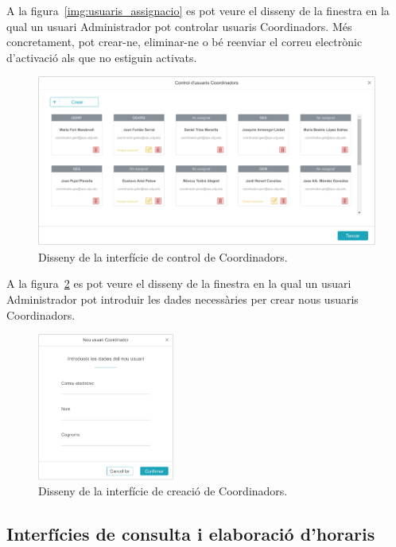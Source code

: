 \documentclass[a4paper,12pt]{ThesisStyle}
\begin{document}
A la figura~\ref{img:usuaris_assignacio} es pot veure el disseny de la finestra en la qual un usuari Administrador pot controlar usuaris Coordinadors. Més concretament, pot crear-ne, eliminar-ne o bé reenviar el correu electrònic d'activació als que no estiguin activats.
\begin{figure}[H]
	\centering
	\includegraphics[width=\textwidth]{assets/interfaces/usuaris/control.pdf}
	\caption{\label{img:usuaris_control}Disseny de la interfície de control de Coordinadors.}
\end{figure}

A la figura~\ref{img:usuaris_crear} es pot veure el disseny de la finestra en la qual un usuari Administrador pot introduir les dades necessàries per crear nous usuaris Coordinadors.
\begin{figure}[H]
	\centering
	\includegraphics[width=0.4\textwidth]{assets/interfaces/usuaris/crear.pdf}
	\caption{\label{img:usuaris_crear}Disseny de la interfície de creació de Coordinadors.}
\end{figure}

\newpage

\subsection{Interfícies de consulta i elaboració d'horaris}
\label{subsec:interficies_horaris}
\end{document}
